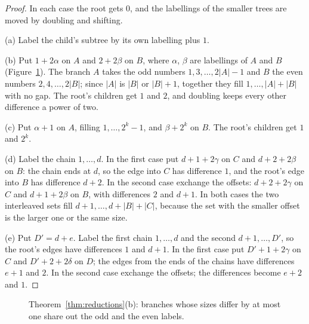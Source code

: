 \documentclass[11pt]{article}
\theoremstyle{remark}
\begin{document}
\begin{proof}
In each case the root gets $0$, and the labellings of the smaller trees are moved by doubling and
shifting.

(a) Label the child's subtree by its own labelling plus $1$.

(b) Put $1+2\alpha$ on $A$ and $2+2\beta$ on $B$, where $\alpha$, $\beta$ are labellings of $A$
and $B$ (Figure~\ref{fig:parity}). The branch $A$ takes the odd numbers $1,3,\dots,2|A|-1$ and
$B$ the even numbers $2,4,\dots,2|B|$; since $|A|$ is $|B|$ or $|B|+1$, together they fill
$1,\dots,|A|+|B|$ with no gap. The root's children get $1$ and $2$, and doubling keeps every
other difference a power of two.

(c) Put $\alpha+1$ on $A$, filling $1,\dots,2^k-1$, and $\beta+2^k$ on $B$. The root's children
get $1$ and $2^k$.

(d) Label the chain $1,\dots,d$. In the first case put $d+1+2\gamma$ on $C$ and $d+2+2\beta$ on
$B$: the chain ends at $d$, so the edge into $C$ has difference $1$, and the root's edge into $B$
has difference $d+2$. In the second case exchange the offsets: $d+2+2\gamma$ on $C$ and
$d+1+2\beta$ on $B$, with differences $2$ and $d+1$. In both cases the two interleaved sets fill
$d+1,\dots,d+|B|+|C|$, because the set with the smaller offset is the larger one or the same size.

(e) Put $D'=d+e$. Label the first chain $1,\dots,d$ and the second $d+1,\dots,D'$, so the root's
edges have differences $1$ and $d+1$. In the first case put $D'+1+2\gamma$ on $C$ and
$D'+2+2\delta$ on $D$; the edges from the ends of the chains have differences $e+1$ and $2$. In
the second case exchange the offsets; the differences become $e+2$ and $1$.
\end{proof}

\begin{figure}[ht]
\centering
{}
\caption{Theorem~\ref{thm:reductions}(b): branches whose sizes differ by at most one share out the
odd and the even labels.}
\label{fig:parity}
\end{figure}
\end{document}
